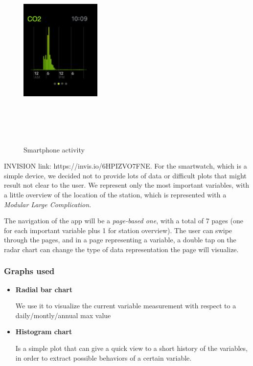 \documentclass[12pt]{article} %
\begin{document}
\begin{figure}[H]
  \includegraphics[width=4cm,height=10cm,keepaspectratio]{img/histoAW.png}
  \hfill
  \caption{Smartphone activity}
  \label{fig:boat1}
\end{figure}
INVISION link: https://invis.io/6HPIZVO7FNE.
For the smartwatch, which is a simple device, we decided not to provide lots of data or difficult plots that might result not clear to the user.
We represent only the most important variables, with a little overview of the location of the station, which is represented with a \textit{Modular Large Complication}.

The navigation of the app will be a \textit{page-based one}, with a total of 7 pages (one for each important variable plus 1 for station overview).
The user can swipe through the pages, and in a page representing a variable, a double tap on the radar chart can change the type of data representation the page will visualize.

\subsubsection{Graphs used}
\begin{itemize}
\item \textbf{Radial bar chart}

We use it to visualize the current variable measurement with respect to a daily/montly/annual max value
\item \textbf{Histogram chart}

Is a simple plot that can give a quick view to a short history of the variables, in order to extract possible behaviors of a certain variable.
\end{itemize}
\end{document}
